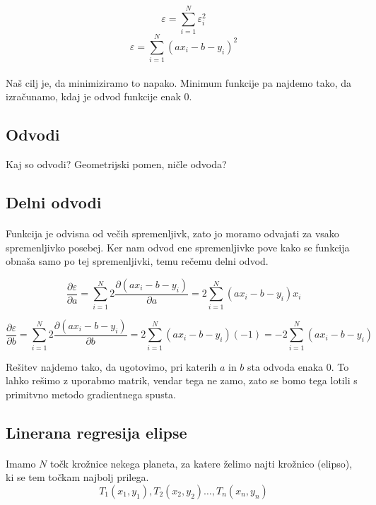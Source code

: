 \documentclass[a4paper, 12pt]{article}
\begin{document}
	$$\varepsilon = \sum_{i=1}^{N} \varepsilon_i^2$$
	$$\varepsilon = \sum_{i=1}^{N} (a x_i - b - y_i)^2$$

	\paragraph{}
	Naš cilj je, da minimiziramo to napako. Minimum funkcije pa najdemo tako, da izračunamo, kdaj je odvod funkcije enak 0.

	\subsection{Odvodi}
	Kaj so odvodi? Geometrijski pomen, ničle odvoda?

	\subsection*{Delni odvodi}
	\paragraph{}
	Funkcija je odvisna od večih spremenljivk, zato jo moramo odvajati za vsako spremenljivko posebej. Ker nam odvod ene spremenljivke pove kako se funkcija obnaša samo po tej spremenljivki, temu rečemu delni odvod.

	$$\frac{\partial \varepsilon}{\partial a} =
		\sum_{i=1}^{N} 2 \frac{\partial (a x_i - b - y_i)}{\partial a} =
		2 \sum_{i=1}^{N} (a x_i - b - y_i)x_i$$

	$$\frac{\partial \varepsilon}{\partial b} =
		\sum_{i=1}^{N} 2 \frac{\partial (a x_i - b - y_i)}{\partial b} =
		2 \sum_{i=1}^{N} (a x_i - b - y_i)(-1) = -2 \sum_{i=1}^{N} (a x_i - b - y_i)$$

	Rešitev najdemo tako, da ugotovimo, pri katerih $a$ in $b$ sta odvoda enaka 0. To lahko rešimo z uporabmo matrik, vendar tega ne zamo, zato se bomo tega lotili s primitvno metodo gradientnega spusta.


	\subsection*{Linerana regresija elipse}
	\paragraph{}
	Imamo $N$ točk krožnice nekega planeta, za katere želimo najti krožnico (elipso), ki se tem točkam najbolj prilega.
	$$T_1(x_1, y_1), T_2(x_2, y_2) \ldots, T_n(x_n, y_n)$$
\end{document}
